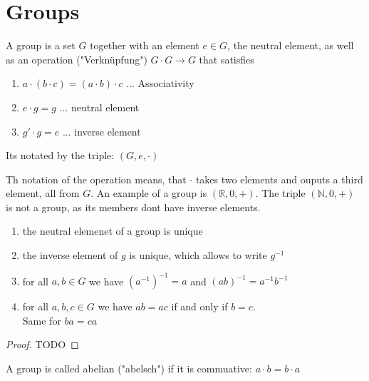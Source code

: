 

\section{Groups}

\begin{framed}
\begin{definition}[Group]
    A group is a set $G$ together with an element $e\in G$, the neutral element, as well as an operation ("Verknüpfung") $G\cdot G \rightarrow G$ that satisfies
    \begin{enumerate}[itemsep=3pt, topsep=3pt]
        \item $a\cdot (b\cdot c) = (a\cdot b) \cdot c $ ... Associativity 
        \item $e\cdot g = g$ ... neutral element
        \item $g' \cdot g = e$ ... inverse element
    \end{enumerate}
    Its notated by the triple: $(G,e,\cdot)$
\end{definition}
\end{framed}
Th notation of the operation means, that $\cdot$ takes two elements and ouputs a third element, all from $G$.  
An example of a group is $(\mathbb{R}, 0, +)$. The triple $(\mathbb{N},0,+)$ is not a group, as its members dont have inverse elements.

\begin{framed}
\begin{lemma}
    \label{lem:groupproperties}
    \begin{enumerate}[itemsep=3pt, topsep=3pt]
        \item the neutral elemenet of a group is unique
        \item the inverse element of $g$ is unique, which allows to write $g^{-1}$
        \item for all $a,b\in G$ we have $(a^{-1})^{-1} = a$ and $(ab)^{-1} = a^{-1} b^{-1}$
        \item for all $a,b,c\in G$ we have $ab=ac$ if and only if $b=c$. \\Same for $ba=ca$
    \end{enumerate}
\end{lemma}
\end{framed}
\begin{proof}
    TODO
\end{proof}

\begin{framed}
\begin{definition}
    A group is called abelian ("abelsch") if it is commuative: $a\cdot b = b\cdot a$
\end{definition}
\end{framed}


